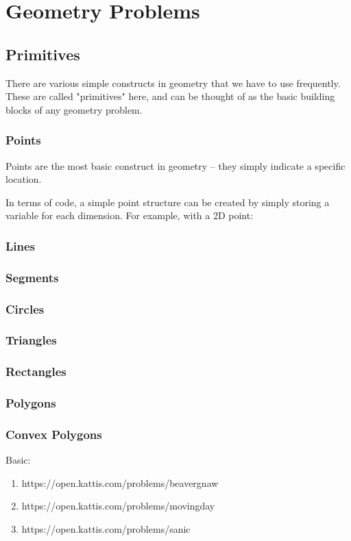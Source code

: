 \section{Geometry Problems}

\subsection{Primitives}

There are various simple constructs in geometry that we have to use frequently. These are called "primitives" here, and can be thought of as the basic building blocks of any geometry problem.

\subsubsection{Points}

Points are the most basic construct in geometry -- they simply indicate a specific location.

In terms of code, a simple point structure can be created by simply storing a variable for each dimension. For example, with a 2D point:


\subsubsection{Lines}

\subsubsection{Segments}

\subsubsection{Circles}

\subsubsection{Triangles}

\subsubsection{Rectangles}

\subsubsection{Polygons}

\subsubsection{Convex Polygons}

\hrulefill

Basic:
\begin{enumerate}
\item https://open.kattis.com/problems/beavergnaw
\item https://open.kattis.com/problems/movingday
\item https://open.kattis.com/problems/sanic
\end{enumerate}
